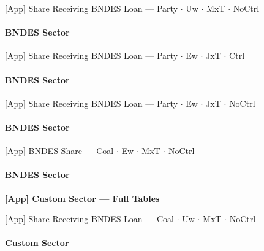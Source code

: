 \documentclass[aspectratio=169,10pt]{beamer}
\newcommand{\tbndes}{../tables/agg_firm_bndes_sector}
\newcommand{\tgroup}{../tables/agg_firm_grouped}
\begin{document}
\begin{frame}[t,shrink=5]{[App] Share Receiving BNDES Loan --- Party $\cdot$ Uw $\cdot$ MxT $\cdot$ NoCtrl}
\framesubtitle{BNDES Sector}
\begin{center}\footnotesize

\end{center}
\end{frame}

\begin{frame}[t,shrink=5]{[App] Share Receiving BNDES Loan --- Party $\cdot$ Ew $\cdot$ JxT $\cdot$ Ctrl}
\framesubtitle{BNDES Sector}
\begin{center}\footnotesize

\end{center}
\end{frame}

\begin{frame}[t,shrink=5]{[App] Share Receiving BNDES Loan --- Party $\cdot$ Ew $\cdot$ JxT $\cdot$ NoCtrl}
\framesubtitle{BNDES Sector}
\begin{center}\footnotesize

\end{center}
\end{frame}

\begin{frame}[t,shrink=5]{[App] BNDES Share --- Coal $\cdot$ Ew $\cdot$ MxT $\cdot$ NoCtrl}
\framesubtitle{BNDES Sector}
\begin{center}\footnotesize

\end{center}
\end{frame}

\begin{frame}[plain]
\begin{center}
{\Large\textbf{[App] Custom Sector --- Full Tables}}
\end{center}
\end{frame}

\begin{frame}[t,shrink=5]{[App] Share Receiving BNDES Loan --- Coal $\cdot$ Uw $\cdot$ MxT $\cdot$ NoCtrl}
\framesubtitle{Custom Sector}
\begin{center}\footnotesize

\end{center}
\end{frame}
\end{document}

